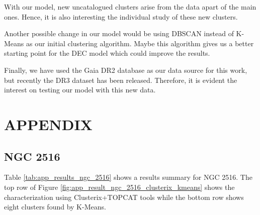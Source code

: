 \documentclass[11pt,a4paper,english,twocolumn]{article}
\begin{document}
With our model, new uncatalogued clusters arise from the data apart of the main ones.
Hence, it is also interesting the individual study of these new clusters.

Another possible change in our model would be using DBSCAN instead of K-Means
as our initial clustering algorithm. Maybe this algorithm gives us a better starting
point for the DEC model which could improve the results.

Finally, we have used the Gaia DR2 database as our data source for this work,
but recently the DR3 dataset has been released.
Therefore, it is evident the interest on testing our model with this new data.

\appendix
\section{APPENDIX}
\label{sec:appendix}

\subsection{NGC 2516}
\label{sec:ngc2516}

\begin{table}[htbp]
  \begin{center}
    \caption{NGC 2516 results.}
    \label{tab:app_results_ngc_2516}
  \end{center}
\end{table}

Table \ref{tab:app_results_ngc_2516} shows a results summary for NGC 2516.
The top row of Figure \ref{fig:app_result_ngc_2516_clusterix_kmeans} shows
the characterization using Clusterix+TOPCAT tools while the bottom row
shows eight clusters found by K-Means.
\end{document}

